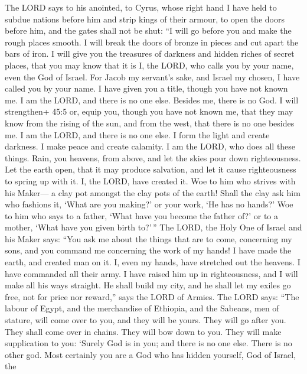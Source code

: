  The LORD says to his anointed, to Cyrus, whose right hand I
have held to subdue nations before him and strip kings of their armour,
to open the doors before him, and the gates shall not be shut:
 ``I will go before you and make the rough places smooth. I
will break the doors of bronze in pieces and cut apart the bars of iron.
 I will give you the treasures of darkness and hidden riches
of secret places, that you may know that it is I, the LORD, who calls
you by your name, even the God of Israel.  For Jacob my
servant's sake, and Israel my chosen, I have called you by your name. I
have given you a title, though you have not known me.  I am
the LORD, and there is no one else. Besides me, there is no God. I will
strengthen+ 45:5 or, equip you, though you have not known me,
 that they may know from the rising of the sun, and from the
west, that there is no one besides me. I am the LORD, and there is no
one else.  I form the light and create darkness. I make
peace and create calamity. I am the LORD, who does all these things.
 Rain, you heavens, from above, and let the skies pour down
righteousness. Let the earth open, that it may produce salvation, and
let it cause righteousness to spring up with it. I, the LORD, have
created it.  Woe to him who strives with his Maker--- a clay
pot amongst the clay pots of the earth! Shall the clay ask him who
fashions it, `What are you making?' or your work, `He has no hands?'
 Woe to him who says to a father, `What have you become the
father of?' or to a mother, `What have you given birth to?'\,''
 The LORD, the Holy One of Israel and his Maker says: ``You
ask me about the things that are to come, concerning my sons, and you
command me concerning the work of my hands!  I have made
the earth, and created man on it. I, even my hands, have stretched out
the heavens. I have commanded all their army.  I have
raised him up in righteousness, and I will make all his ways straight.
He shall build my city, and he shall let my exiles go free, not for
price nor reward,'' says the LORD of Armies.  The LORD
says: ``The labour of Egypt, and the merchandise of Ethiopia, and the
Sabeans, men of stature, will come over to you, and they will be yours.
They will go after you. They shall come over in chains. They will bow
down to you. They will make supplication to you: `Surely God is in you;
and there is no one else. There is no other god.  Most
certainly you are a God who has hidden yourself, God of Israel, the
